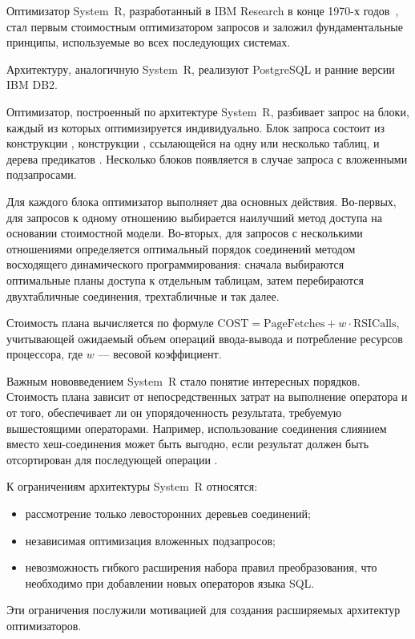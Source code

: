 \documentclass[fontsize=14pt, russian]{scrartcl}
\begin{document}
Оптимизатор System~R, разработанный в IBM Research в конце 1970-х
годов~\cite{Selinger1979}, стал первым стоимостным оптимизатором запросов и
заложил фундаментальные принципы, используемые во всех последующих системах.

Архитектуру, аналогичную System~R, реализуют PostgreSQL и ранние версии IBM DB2.

Оптимизатор, построенный по архитектуре System~R, разбивает запрос на блоки,
каждый из которых оптимизируется индивидуально. Блок запроса состоит из
конструкции \SELECT, конструкции \FROM, ссылающейся на одну или
несколько таблиц, и дерева предикатов \WHERE. Несколько блоков
появляется в случае запроса с вложенными подзапросами.

Для каждого блока оптимизатор выполняет два основных действия. Во-первых, для
запросов к одному отношению выбирается наилучший метод доступа на основании
стоимостной модели. Во-вторых, для запросов с несколькими отношениями
определяется оптимальный порядок соединений методом восходящего динамического
программирования: сначала выбираются оптимальные планы доступа к отдельным
таблицам, затем перебираются двухтабличные соединения, трехтабличные и так
далее.

Стоимость плана вычисляется по формуле
\(\text{COST} = \text{PageFetches} + w \cdot \text{RSICalls}\), учитывающей
ожидаемый объем операций ввода-вывода и потребление ресурсов процессора, где
\(w\) --- весовой коэффициент.

Важным нововведением System~R стало понятие интересных порядков. Стоимость плана
зависит от непосредственных затрат на выполнение оператора и от
того, обеспечивает ли он упорядоченность результата, требуемую вышестоящими
операторами. Например, использование соединения слиянием вместо хеш-соединения
может быть выгодно, если результат должен быть отсортирован для последующей
операции \ORDERBY.

К ограничениям архитектуры System~R относятся:

\begin{itemize}
  \item рассмотрение только левосторонних
  деревьев соединений;
  \item независимая оптимизация вложенных подзапросов;
  \item невозможность гибкого расширения набора правил преобразования, что
        необходимо при добавлении новых операторов языка SQL\@.
\end{itemize}

Эти ограничения послужили мотивацией для создания расширяемых архитектур
оптимизаторов.
\end{document}
